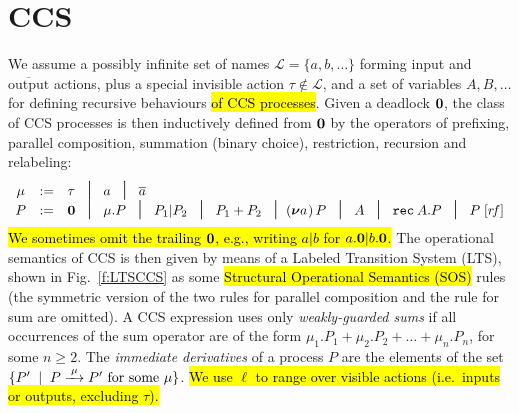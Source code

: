 
\section{CCS}
\label{ss:ccs}

We assume a possibly infinite set of names $\mathscr{L} = \{a, b,
\ldots\}$ forming input and $\overline{\mbox{output}}$ actions, plus a special invisible
action $\tau \notin \mathscr{L}$, and a set of variables $A, B,
\ldots$ for defining recursive behaviours \hl{of CCS processes}.
Given a deadlock ${\boldsymbol 0}$, the class of CCS processes is then inductively defined from ${\boldsymbol 0}$ by the operators
of prefixing, parallel composition, summation (binary choice), restriction, recursion and relabeling:
\begin{equation*}
\begin{array}{ccl}
\mu  & := &  \tau \hspace{.3pt} \; \midd \; a  \; \midd \;  \outC a  \\
P  & := &  \nil \; \midd \;  \mu . P \; \midd \;  P_1 |  P_2 \; \midd  \;
P_1 + P_2 \; \midd %
  (\res a\!)\, P  \;  \midd \;  A \; \midd \; \recu A  P
\; \midd \; P\; [r\!f]  %
\end{array}
\end{equation*}
\hl{We sometimes omit the trailing ${\boldsymbol 0}$, e.g., writing $a|b$ for $a.{\boldsymbol 0} |b .{\boldsymbol 0}$.}
The operational semantics of CCS is then given by means of
a Labeled Transition System (LTS), shown in Fig.~\ref{f:LTSCCS} as
some \hl{Structural Operational Semantics (SOS)}
rules (the symmetric version of the two rules for
parallel composition and the rule for sum are omitted).
A CCS expression uses only \emph{weakly-guarded sums} if all occurrences of
the sum operator are of the form $\mu_1.P_1 + \mu_2.P_2 + \ldots
+ \mu_n.P_n$, for some $n \geq 2$.
 The \emph{immediate derivatives} of a
process $P$ are the elements of the set $\{P' \st P \arr\mu P' \mbox{
  for some $\mu$}\}$.
 \hl{We use $\ell$ to range over
  visible actions (i.e.~inputs or outputs, excluding  $\tau$).}
